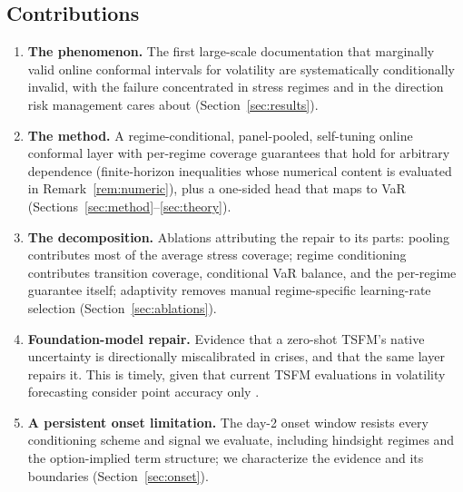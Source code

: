 \subsection*{Contributions}
\begin{enumerate}
\item \textbf{The phenomenon.} The first large-scale documentation that
  marginally valid online conformal intervals for volatility are
  systematically conditionally invalid, with the failure concentrated in
  stress regimes and in the direction risk management cares about
  (Section~\ref{sec:results}).
\item \textbf{The method.} A regime-conditional, panel-pooled, self-tuning
  online conformal layer with per-regime coverage guarantees
  that hold for arbitrary dependence (finite-horizon inequalities whose
  numerical content is evaluated in Remark~\ref{rem:numeric}), plus
  a one-sided head that maps to VaR
  (Sections~\ref{sec:method}--\ref{sec:theory}).
\item \textbf{The decomposition.} Ablations attributing the repair to its
  parts: pooling contributes most of the average stress coverage; regime
  conditioning contributes transition coverage, conditional VaR balance,
  and the per-regime guarantee itself; adaptivity removes manual
  regime-specific learning-rate selection
  (Section~\ref{sec:ablations}).
\item \textbf{Foundation-model repair.} Evidence that a zero-shot TSFM's
  native uncertainty is directionally miscalibrated in crises, and that
  the same layer repairs it. This is timely, given that current TSFM
  evaluations in volatility forecasting consider point accuracy only
  \citep{brini2026forecasting}.
\item \textbf{A persistent onset limitation.} The day-2 onset window
  resists every conditioning scheme and signal we evaluate, including
  hindsight regimes and the option-implied term structure; we
  characterize the evidence and its boundaries
  (Section~\ref{sec:onset}).
\end{enumerate}
